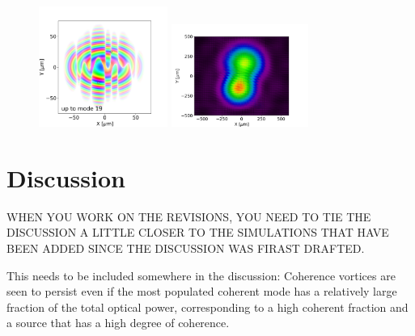 \documentclass{iucr}              %
\newcommand{\inblue}[1]{{\color{blue}#1}}
\begin{document}
\begin{figure}
\includegraphics[width=0.375\textwidth]{Figures/interference_D_uptomode0019_csd.png}
\includegraphics[width=0.4\textwidth]{Figures/interference_D_uptomode0019_pattern.png}

\label{young}
\end{figure}

%
%

% 
% 
% 
% 
% 


\section{Discussion}

WHEN YOU WORK ON THE REVISIONS, YOU NEED TO TIE THE DISCUSSION A  LITTLE CLOSER TO THE SIMULATIONS THAT HAVE BEEN ADDED SINCE THE DISCUSSION WAS FIRAST DRAFTED.

{\color{red} This needs to be included somewhere in the discussion: Coherence vortices are seen to persist even if the most populated coherent mode has a relatively large fraction of the total optical power, corresponding to a high coherent fraction and a source that has a high degree of coherence.}
\end{document}
